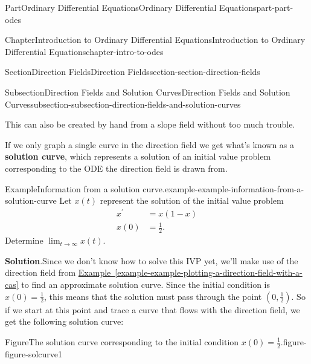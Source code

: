 \documentclass[twoside,10pt,]{book}
\newcommand{\blocktitlefont}{\relax}
\newcommand{\xreffont}{\relax}
\newcommand{\terminology}[1]{\textbf{#1}}
\numberwithin{equation}{part}
\begin{document}
\begin{partptx}{Part}{Ordinary Differential Equations}{}{Ordinary Differential Equations}{}{}{part-part-odes}
\begin{chapterptx}{Chapter}{Introduction to Ordinary Differential Equations}{}{Introduction to Ordinary Differential Equations}{}{}{chapter-intro-to-odes}
\begin{sectionptx}{Section}{Direction Fields}{}{Direction Fields}{}{}{section-section-direction-fields}
\begin{subsectionptx}{Subsection}{Direction Fields and Solution Curves}{}{Direction Fields and Solution Curves}{}{}{subsection-subsection-direction-fields-and-solution-curves}
\begin{sageinput}
\end{sageinput}
 This can also be created by hand from a slope field without too much trouble.%
\par
If we only graph a single curve in the direction field we get what's known as a \terminology{solution curve}, which represents a solution of an initial value problem corresponding to the ODE the direction field is drawn from.%
\begin{example}{Example}{Information from a solution curve.}{example-example-information-from-a-solution-curve}%
Let \(x(t)\) represent the solution of the initial value problem%
\begin{align*}
x^\prime & = x(1-x) \\
x(0) & = \frac{1}{2}. 
\end{align*}
Determine \(\lim_{t\to\infty}x(t)\).%
\par\smallskip%
\noindent\textbf{\blocktitlefont Solution}.\hypertarget{solution-example-information-from-a-solution-curve-c}{}\quad{}Since we don't know how to solve this IVP yet, we'll make use of the direction field from \hyperref[example-example-plotting-a-direction-field-with-a-cas]{Example~{\xreffont\ref{example-example-plotting-a-direction-field-with-a-cas}}} to find an approximate solution curve. Since the initial condition is \(x(0) = \frac{1}{2}\), this means that the solution must pass through the point \((0,\frac{1}{2})\). So if we start at this point and trace a curve that flows with the direction field, we get the following solution curve:%
\begin{figureptx}{Figure}{The solution curve corresponding to the initial condition \(x(0) = \frac{1}{2}\).}{figure-figure-solcurve1}{}%
\begin{image}{0.25}{0.5}{0.25}{}%

\end{image}
\end{figureptx}
\end{example}
\end{subsectionptx}
\end{sectionptx}
\end{chapterptx}
\end{partptx}
\end{document}
